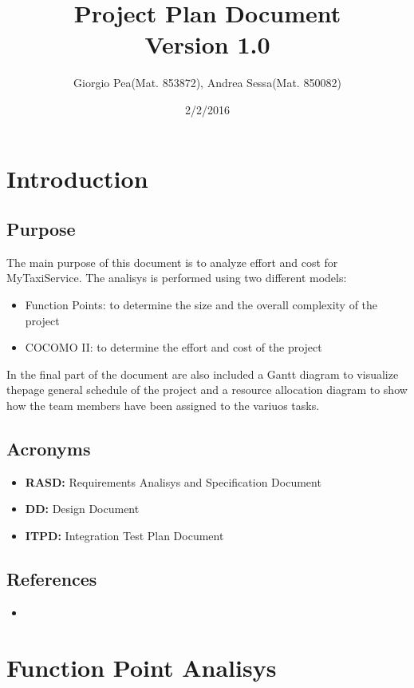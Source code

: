 \documentclass[11pt,titlepage]{article} %
\title{Project Plan Document \\ \vspace{1cm} \large{Version 1.0}}
\author{Giorgio Pea(Mat. 853872), Andrea Sessa(Mat. 850082)}
\date{2/2/2016}
\begin{document}
\maketitle

\newpage

\tableofcontents

\newpage

\section{Introduction}
  \subsection{Purpose}
    The main purpose of this document is to analyze effort and cost for MyTaxiService.
    The analisys is performed using two different models:
    \begin{itemize}
     \item Function Points: to determine the size and the overall complexity of the project
     \item COCOMO II: to determine the effort and cost of the project
    \end{itemize}
    In the final part of the document are also included a Gantt diagram to visualize thepage
    general schedule of the project and a resource allocation diagram to show how the team 
    members have been assigned to the variuos tasks.

  \subsection{Acronyms}
    \begin{itemize}
     \item \textbf{RASD:} Requirements Analisys and Specification Document
     \item \textbf{DD:} Design Document
     \item \textbf{ITPD:} Integration Test Plan Document
    \end{itemize}
  \subsection{References}
    \begin{itemize}
     \item 
    \end{itemize}

\section{Function Point Analisys}
\end{document}
